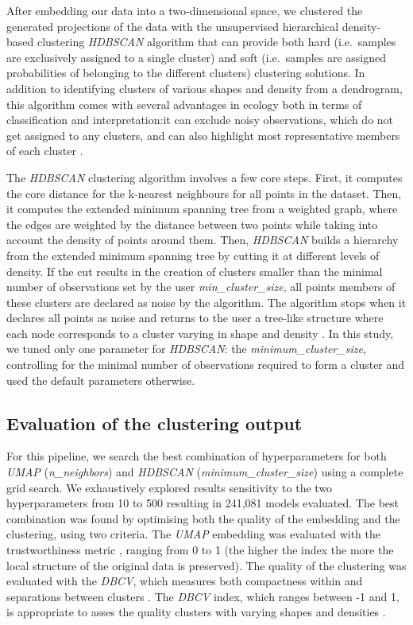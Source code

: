 \begin{refsection}
After embedding our data into a two-dimensional space, we clustered the
generated projections of the data with the unsupervised hierarchical
density-based clustering \emph{HDBSCAN} algorithm that can provide both
hard (i.e.~samples are exclusively assigned to a single cluster) and
soft (i.e.~samples are assigned probabilities of belonging to the
different clusters) clustering solutions. In addition to identifying
clusters of various shapes and density from a dendrogram, this algorithm
comes with several advantages in ecology both in terms of classification
and interpretation:it can exclude noisy observations, which do not get
assigned to any clusters, and can also highlight most representative
members of each cluster \autocites[ ]{Campello_2013}{McInnes2017}.

The \emph{HDBSCAN} clustering algorithm involves a few core steps.
First, it computes the core distance for the k-nearest neighbours for
all points in the dataset. Then, it computes the extended minimum
spanning tree from a weighted graph, where the edges are weighted by the
distance between two points while taking into account the density of
points around them. Then, \emph{HDBSCAN} builds a hierarchy from the
extended minimum spanning tree by cutting it at different levels of
density. If the cut results in the creation of clusters smaller than the
minimal number of observations set by the user
\emph{min\_cluster\_size}, all points members of these clusters are
declared as noise by the algorithm. The algorithm stops when it declares
all points as noise and returns to the user a tree-like structure where
each node corresponds to a cluster varying in shape and density
\autocites[ ]{Campello_2013}{McInnes2017}. In this study, we tuned only
one parameter for \emph{HDBSCAN}: the \emph{minimum\_cluster\_size},
controlling for the minimal number of observations required to form a
cluster and used the default parameters otherwise.

\hypertarget{evaluation-of-the-clustering-output}{%
\subsection{Evaluation of the clustering
output}\label{evaluation-of-the-clustering-output}}

For this pipeline, we search the best combination of hyperparameters for
both \emph{UMAP} (\emph{n\_neighbors}) and \emph{HDBSCAN}
(\emph{minimum\_cluster\_size}) using a complete grid search. We
exhaustively explored results sensitivity to the two hyperparameters
from 10 to 500 resulting in 241,081 models evaluated. The best
combination was found by optimising both the quality of the embedding
and the clustering, using two criteria. The \emph{UMAP} embedding was
evaluated with the trustworthiness metric \autocite{Venna_2001}, ranging
from 0 to 1 (the higher the index the more the local structure of the
original data is preserved). The quality of the clustering was evaluated
with the \emph{DBCV}, which measures both compactness within and
separations between clusters \autocite{Moulavi_2014}. The \emph{DBCV}
index, which ranges between -1 and 1, is appropriate to asses the
quality clusters with varying shapes and densities
\autocite{Moulavi_2014}.


\end{refsection}
